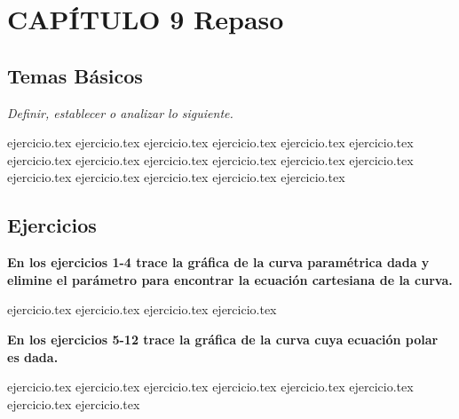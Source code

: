 
\section*{CAPÍTULO 9 \quad Repaso}

\subsection*{Temas Básicos}
\noindent\textit{Definir, establecer o analizar lo siguiente.}
\begin{enumerate}
    {ejercicio.tex}
{ejercicio.tex}
{ejercicio.tex}
{ejercicio.tex}
{ejercicio.tex}
{ejercicio.tex}
{ejercicio.tex}
{ejercicio.tex}
{ejercicio.tex}
{ejercicio.tex}
{ejercicio.tex}
{ejercicio.tex}
{ejercicio.tex}
{ejercicio.tex}
{ejercicio.tex}
{ejercicio.tex}
{ejercicio.tex}
\end{enumerate}

\subsection*{Ejercicios}

\noindent\textbf{En los ejercicios 1-4 trace la gráfica de la curva paramétrica dada y elimine el parámetro para encontrar la ecuación cartesiana de la curva.}
\begin{enumerate}
    {ejercicio.tex}
{ejercicio.tex}
{ejercicio.tex}
{ejercicio.tex}
\end{enumerate}

\vspace{0.3cm}
\noindent\textbf{En los ejercicios 5-12 trace la gráfica de la curva cuya ecuación polar es dada.}
\begin{enumerate}
    \setcounter{enumi}{4}
    {ejercicio.tex}
{ejercicio.tex}
{ejercicio.tex}
{ejercicio.tex}
{ejercicio.tex}
{ejercicio.tex}
{ejercicio.tex}
{ejercicio.tex}
\end{enumerate}

